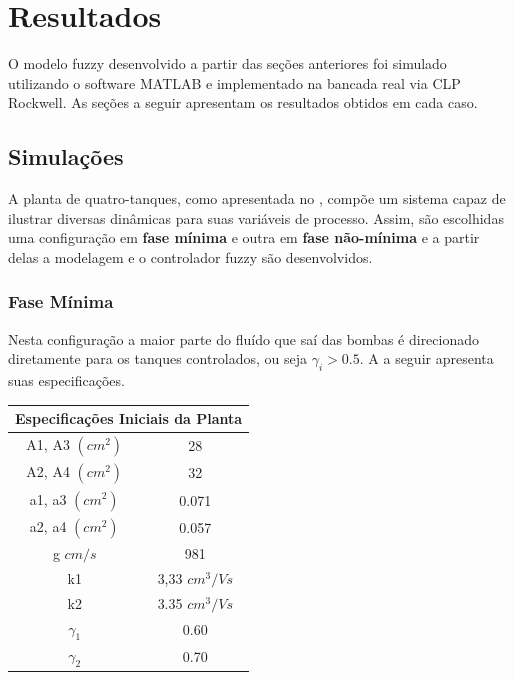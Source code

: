 %

\chapter{Resultados} \label{capRes}

O modelo fuzzy desenvolvido a partir das seções anteriores foi simulado utilizando o software MATLAB e implementado na bancada real via CLP Rockwell. As seções a seguir apresentam os resultados obtidos em cada caso.

\section{Simulações} \label{secAnalise}
A planta de quatro-tanques, como apresentada no , compõe um sistema capaz de ilustrar diversas dinâmicas para suas variáveis de processo. Assim, são escolhidas uma configuração em \textbf{fase mínima }e outra em \textbf{fase não-mínima} e a partir delas a modelagem e o controlador fuzzy são desenvolvidos. 

\subsection{Fase Mínima}
Nesta configuração a maior parte do fluído que saí das bombas é direcionado diretamente para os tanques controlados, ou seja $\gamma_i > 0.5$. A  a seguir apresenta suas especificações.

\begin{center} \label{tabFaseMinima}
	\begin{tabular}{|c|c|}
		\hline
		\multicolumn{2}{|c|}{Especificações Iniciais da Planta} \\
		\hline
		A1, A3 $(cm^2)$ & 28 \\ \hline
		A2, A4 $(cm^2)$ & 32 \\ \hline
		a1, a3 $(cm^2)$ & 0.071 \\ \hline
		a2, a4 $(cm^2)$ & 0.057 \\ \hline
		g $cm/s$ & 981 \\ \hline
		k1 & 3,33 $cm^3/Vs$ \\ \hline
		k2 & 3.35 $cm^3/Vs$ \\ \hline
		$\gamma_1$ & 0.60 \\ \hline
		$\gamma_2$ & 0.70 \\ \hline
		\hline
	\end{tabular}
\end{center}

